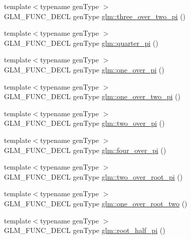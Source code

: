 \begin{DoxyCompactItemize}
\item 
{\footnotesize template$<$typename gen\-Type $>$ }\\G\-L\-M\-\_\-\-F\-U\-N\-C\-\_\-\-D\-E\-C\-L gen\-Type \hyperlink{group__gtc__constants_ga9f3732bc75c0d0892f72e21cfe4f938b}{glm\-::three\-\_\-over\-\_\-two\-\_\-pi} ()
\item 
{\footnotesize template$<$typename gen\-Type $>$ }\\G\-L\-M\-\_\-\-F\-U\-N\-C\-\_\-\-D\-E\-C\-L gen\-Type \hyperlink{group__gtc__constants_ga0148d757b4bfda4d86251b8d1ea1dad3}{glm\-::quarter\-\_\-pi} ()
\item 
{\footnotesize template$<$typename gen\-Type $>$ }\\G\-L\-M\-\_\-\-F\-U\-N\-C\-\_\-\-D\-E\-C\-L gen\-Type \hyperlink{group__gtc__constants_ga9ba09a027db6d4f4e259b01cf5d6c178}{glm\-::one\-\_\-over\-\_\-pi} ()
\item 
{\footnotesize template$<$typename gen\-Type $>$ }\\G\-L\-M\-\_\-\-F\-U\-N\-C\-\_\-\-D\-E\-C\-L gen\-Type \hyperlink{group__gtc__constants_gac1e7dcb42b09c66df7a299c0f007b27d}{glm\-::one\-\_\-over\-\_\-two\-\_\-pi} ()
\item 
{\footnotesize template$<$typename gen\-Type $>$ }\\G\-L\-M\-\_\-\-F\-U\-N\-C\-\_\-\-D\-E\-C\-L gen\-Type \hyperlink{group__gtc__constants_ga85729d38c47351686e8659f80447a7ea}{glm\-::two\-\_\-over\-\_\-pi} ()
\item 
{\footnotesize template$<$typename gen\-Type $>$ }\\G\-L\-M\-\_\-\-F\-U\-N\-C\-\_\-\-D\-E\-C\-L gen\-Type \hyperlink{group__gtc__constants_gafb68d06c9c9dc234210ce91d6707faac}{glm\-::four\-\_\-over\-\_\-pi} ()
\item 
{\footnotesize template$<$typename gen\-Type $>$ }\\G\-L\-M\-\_\-\-F\-U\-N\-C\-\_\-\-D\-E\-C\-L gen\-Type \hyperlink{group__gtc__constants_ga767e539c20585bf60aa63595b0f0b259}{glm\-::two\-\_\-over\-\_\-root\-\_\-pi} ()
\item 
{\footnotesize template$<$typename gen\-Type $>$ }\\G\-L\-M\-\_\-\-F\-U\-N\-C\-\_\-\-D\-E\-C\-L gen\-Type \hyperlink{group__gtc__constants_gac1a9b3248357fd9e9b740bed90e0b1b7}{glm\-::one\-\_\-over\-\_\-root\-\_\-two} ()
\item 
{\footnotesize template$<$typename gen\-Type $>$ }\\G\-L\-M\-\_\-\-F\-U\-N\-C\-\_\-\-D\-E\-C\-L gen\-Type \hyperlink{group__gtc__constants_gaec5af85e2148c118aad7e797430fdeb0}{glm\-::root\-\_\-half\-\_\-pi} ()

\end{DoxyCompactItemize}
